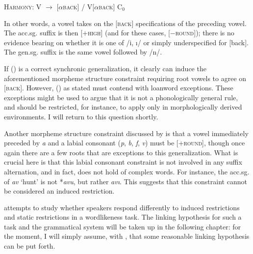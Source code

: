 \ex {} \textsc{Harmony}: %
V $\rightarrow$ [$\alpha$\textsc{back}] / V[$\alpha$\textsc{back}] C$_0$ \gap\gap \xe

In other words, a vowel takes on the [\textsc{back}] specifications of the preceding vowel. The acc.sg. suffix is then [$+$\textsc{high}] (and for these cases, [$-$\textsc{round}]); there is no evidence bearing on whether it is one of /i, \i/ or simply underspecified for [back]. The gen.sg. suffix is the same vowel followed by /n/. 

If (\lastx) is a correct synchronic generalization, it clearly can induce the aforementioned morpheme structure constraint requiring root vowels to agree on [\textsc{back}]. However, (\lastx) as stated must contend with loanword exceptions. These exceptions might be used to argue that it is not a phonologically general rule, and should be restricted, for instance, to apply only in morphologically derived environments. I will return to this question shortly. 

Another morpheme structure constraint discussed by \citeauthor{Zimmer1969} is that a vowel immediately preceded by \emph{a} and a labial consonant (\emph{p}, \emph{b}, \emph{f}, \emph{v}) must be [$+$\textsc{round}], though once again there are a few roots that are exceptions to this generalization. What is crucial here is that this labial consonant constraint is not involved in any suffix alternation, and in fact, does not hold of complex words. For instance, the acc.sg. of \emph{av} `hunt' is not *\emph{avu}, but rather \emph{av\i}. This suggests that this constraint cannot be considered an induced restriction.

\citeauthor{Zimmer1969} attempts to study whether speakers respond differently to induced restrictions and static restrictions in a wordlikeness task. The linking hypothesis for such a task and the grammatical system will be taken up in the following chapter: for the moment, I will simply assume, with \citeauthor{Zimmer1969}, that some reasonable linking hypothesis can be put forth. 

